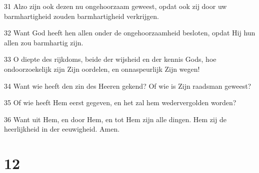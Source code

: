 \par 31 Alzo zijn ook dezen nu ongehoorzaam geweest, opdat ook zij door uw barmhartigheid zouden barmhartigheid verkrijgen.
\par 32 Want God heeft hen allen onder de ongehoorzaamheid besloten, opdat Hij hun allen zou barmhartig zijn.
\par 33 O diepte des rijkdoms, beide der wijsheid en der kennis Gods, hoe ondoorzoekelijk zijn Zijn oordelen, en onnaspeurlijk Zijn wegen!
\par 34 Want wie heeft den zin des Heeren gekend? Of wie is Zijn raadsman geweest?
\par 35 Of wie heeft Hem eerst gegeven, en het zal hem wedervergolden worden?
\par 36 Want uit Hem, en door Hem, en tot Hem zijn alle dingen. Hem zij de heerlijkheid in der eeuwigheid. Amen.

\chapter{12}

